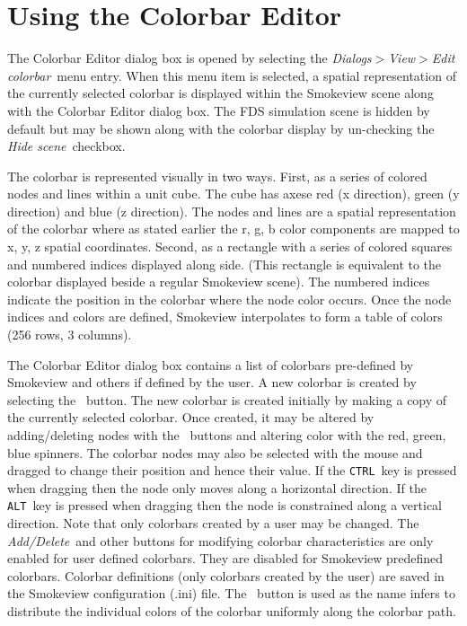 \documentclass[11pt,twoside]{book}
\newcommand{\frameit}[1]{\fbox{\tt #1}}
\begin{document}
\section{Using the Colorbar Editor}
\label{section:colorbar}
The Colorbar Editor dialog box is opened by selecting the {\em
Dialogs$>$View$>$Edit colorbar}\ menu entry. When this menu item is
selected, a spatial representation of the currently selected
colorbar is displayed within the Smokeview scene along with the
Colorbar Editor dialog box.  The FDS simulation scene is hidden
by default but may be shown along with the colorbar display by
un-checking the {\em Hide scene}\ checkbox.

The colorbar is represented visually in two ways.  First, as a series
of colored nodes and lines within a unit cube. The cube has axese red (x direction), green (y direction) and blue (z direction).
The nodes and lines are a spatial representation of the colorbar where as
stated earlier the r, g, b color components are mapped to x, y, z spatial
coordinates.
Second, as a rectangle with a series of colored squares and numbered
indices
displayed along side. (This rectangle is equivalent to the colorbar
displayed beside a regular Smokeview scene).  The numbered indices indicate
the position in the colorbar where the node color occurs.
Once the node indices and colors are defined, Smokeview interpolates to
form a table of colors (256 rows, 3 columns).

The Colorbar Editor dialog box contains a list of colorbars
pre-defined by Smokeview and others if defined by the user. A new
colorbar is created by selecting the \frameit{New}\ button. The
new colorbar is created initially by making a copy of the
currently selected colorbar. Once created, it may be altered by
adding/deleting nodes with the \frameit{Add/Delete}\ buttons and
altering color with the red, green, blue spinners. The colorbar
nodes may also be selected with the mouse and dragged to change
their position and hence their value. If the {\tt CTRL}\ key is
pressed when dragging then the node only moves along a horizontal
direction.  If the {\tt ALT}\ key is pressed when dragging then
the node is constrained along a vertical direction. Note that only
colorbars created by a user may be changed. The {\em Add/Delete}\
and other buttons for modifying colorbar characteristics are only
enabled for user defined colorbars.  They are disabled for
Smokeview predefined colorbars. Colorbar definitions (only
colorbars created by the user) are saved in the Smokeview
configuration (.ini) file.  The \frameit{Distribute nodes uniformly}\
button is used as the name infers to distribute the individual colors
of the colorbar uniformly along the colorbar path.
\end{document}
